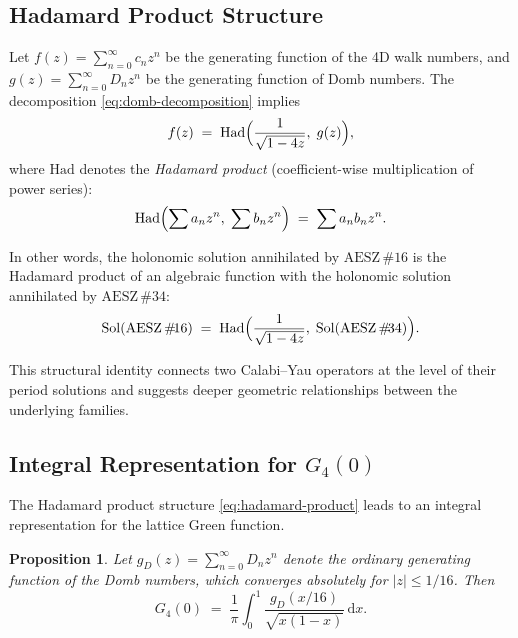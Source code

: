 \documentclass[12pt,a4paper]{article}
\numberwithin{equation}{section}
\theoremstyle{plain}
\newtheorem{proposition}[theorem]{Proposition}
\theoremstyle{definition}
\theoremstyle{remark}
\newcommand{\dd}{\mathrm{d}}
\newcommand{\Had}{\mathrm{Had}}
\newcommand{\aesz}[1]{\mathrm{AESZ}\,\#\!{#1}}
\begin{document}
\subsection{Hadamard Product Structure}

Let $f(z) = \sum_{n=0}^\infty c_n z^n$ be the generating function of the 4D walk numbers, and
$g(z) = \sum_{n=0}^\infty D_n z^n$ be the generating function of Domb numbers. The decomposition
\eqref{eq:domb-decomposition} implies
\begin{equation}\label{eq:hadamard-product}
  f(z) \;=\; \Had\Bigl(\frac{1}{\sqrt{1-4z}},\; g(z)\Bigr),
\end{equation}
where $\Had$ denotes the \emph{Hadamard product} (coefficient-wise multiplication of power series):
\[
  \Had\Bigl(\sum a_n z^n,\; \sum b_n z^n\Bigr) \;=\; \sum a_n b_n z^n.
\]

In other words, the holonomic solution annihilated by $\aesz{16}$ is the Hadamard product of an
algebraic function with the holonomic solution annihilated by $\aesz{34}$:
\begin{equation}\label{eq:aesz-hadamard}
  \mathrm{Sol}(\aesz{16}) \;=\; \Had\Bigl(\frac{1}{\sqrt{1-4z}},\; \mathrm{Sol}(\aesz{34})\Bigr).
\end{equation}

This structural identity connects two Calabi--Yau operators at the level of their period solutions
and suggests deeper geometric relationships between the underlying families.

\subsection{Integral Representation for $G_4(0)$}

The Hadamard product structure \eqref{eq:hadamard-product} leads to an integral representation
for the lattice Green function.

\begin{proposition}\label{prop:integral-rep}
  Let $g_D(z) = \sum_{n=0}^\infty D_n z^n$ denote the ordinary generating function of the Domb numbers,
  which converges absolutely for $|z| \leq 1/16$. Then
  \begin{equation}\label{eq:integral-representation}
    G_4(0) \;=\; \frac{1}{\pi} \int_0^1 \frac{g_D(x/16)}{\sqrt{x(1-x)}}\,\dd x.
  \end{equation}
\end{proposition}
\end{document}
